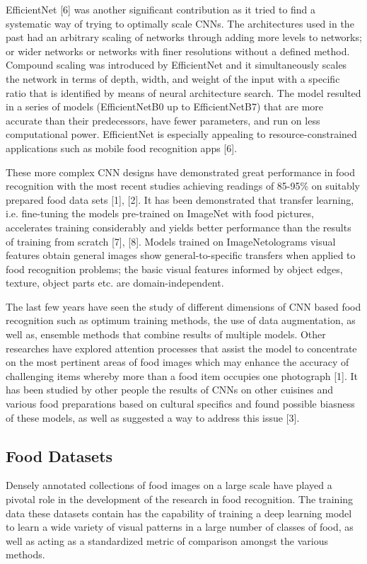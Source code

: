 \documentclass[12pt, openany]{report}
\begin{document}
EfficientNet [6] was another significant contribution as it tried to find a systematic way of trying to optimally scale CNNs. The architectures used in the past had an arbitrary scaling of networks through adding more levels to networks; or wider networks or networks with finer resolutions without a defined method. Compound scaling was introduced by EfficientNet and it simultaneously scales the network in terms of depth, width, and weight of the input with a specific ratio that is identified by means of neural architecture search. The model resulted in a series of models (EfficientNetB0 up to EfficientNetB7) that are more accurate than their predecessors, have fewer parameters, and run on less computational power. EfficientNet is especially appealing to resource-constrained applications such as mobile food recognition apps [6].

These more complex CNN designs have demonstrated great performance in food recognition with the most recent studies achieving readings of 85-95\% on suitably prepared food data sets [1], [2]. It has been demonstrated that transfer learning, i.e. fine-tuning the models pre-trained on ImageNet with food pictures, accelerates training considerably and yields better performance than the results of training from scratch [7], [8]. Models trained on ImageNetolograms visual features obtain general images show general-to-specific transfers when applied to food recognition problems; the basic visual features informed by object edges, texture, object parts etc. are domain-independent.

The last few years have seen the study of different dimensions of CNN based food recognition such as optimum training methods, the use of data augmentation, as well as, ensemble methods that combine results of multiple models. Other researches have explored attention processes that assist the model to concentrate on the most pertinent areas of food images which may enhance the accuracy of challenging items whereby more than a food item occupies one photograph [1]. It has been studied by other people the results of CNNs on other cuisines and various food preparations based on cultural specifics and found possible biasness of these models, as well as suggested a way to address this issue [3].

\subsection{Food Datasets}
Densely annotated collections of food images on a large scale have played a pivotal role in the development of the research in food recognition. The training data these datasets contain has the capability of training a deep learning model to learn a wide variety of visual patterns in a large number of classes of food, as well as acting as a standardized metric of comparison amongst the various methods.
\end{document}
